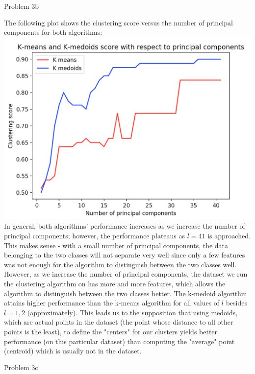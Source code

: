 \documentclass[11pt]{article}
\newcommand{\solution}[1]{{{\color{blue}{\bf Solution:} {#1}}}}
\begin{document}
\item Problem 3b

\solution{
The following plot shows the clustering score versus the number of principal components for both algorithms: \newline{}
\includegraphics[scale=0.7]{kmeans-meds-pca-l-range.png} \newline{}
In general, both algorithms' performance increases as we increase the number of principal components; however, the performance plateaus as $l = 41$ is approached. This makes sense - with a small number of principal components, the data belonging to the two classes will not separate very well since only a few features was not enough for the algorithm to distinguish between the two classes well. However, as we increase the number of principal components, the dataset we run the clustering algorithm on has more and more features, which allows the algorithm to distinguish between the two classes better. \newline{}
The k-medoid algorithm attains higher performance than the k-means algorithm for all values of $l$ besides $l = 1, 2$ (approximately). This leads us to the supposition that using medoids, which are actual points in the dataset (the point whose distance to all other points is the least), to define the "centers" for our clusters yields better performance (on this particular dataset) than computing the "average" point (centroid) which is usually not in the dataset. 
}

\item Problem 3c
\end{document}
